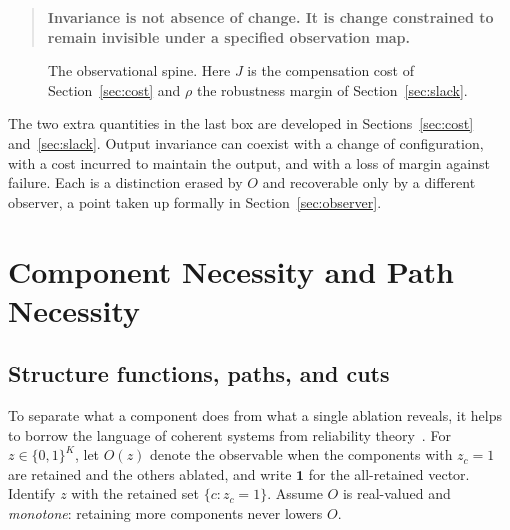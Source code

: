 \documentclass[11pt]{article}
\theoremstyle{definition}
\theoremstyle{remark}
\begin{document}
\begin{quote}
\textbf{Invariance is not absence of change. It is change constrained to remain invisible under a specified observation map.}
\end{quote}

\begin{figure}[ht]
\centering
{}
\caption{The observational spine. Here $J$ is the compensation cost of Section~\ref{sec:cost} and $\rho$ the robustness margin of Section~\ref{sec:slack}.}
\end{figure}

The two extra quantities in the last box are developed in Sections~\ref{sec:cost} and~\ref{sec:slack}. Output invariance can coexist with a change of configuration, with a cost incurred to maintain the output, and with a loss of margin against failure. Each is a distinction erased by $O$ and recoverable only by a different observer, a point taken up formally in Section~\ref{sec:observer}.

\section{Component Necessity and Path Necessity}\label{sec:necessity}

\subsection{Structure functions, paths, and cuts}

To separate what a component does from what a single ablation reveals, it helps to borrow the language of coherent systems from reliability theory~\cite{barlow1975}. For $z\in\{0,1\}^K$, let $O(z)$ denote the observable when the components with $z_c=1$ are retained and the others ablated, and write $\mathbf 1$ for the all-retained vector. Identify $z$ with the retained set $\{c:z_c=1\}$. Assume $O$ is real-valued and \emph{monotone}: retaining more components never lowers $O$.
\end{document}
